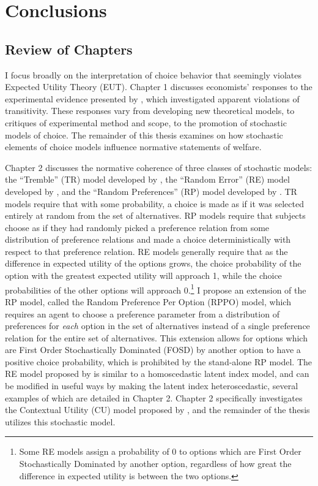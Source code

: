 \documentclass[../main.tex]{subfiles}
\begin{document}
\doublespacing
\setcounter{chapter}{4}

\chapter{Conclusions}


\section{Review of Chapters}

I focus broadly on the interpretation of choice behavior that seemingly violates Expected Utility Theory (EUT).
Chapter 1 discusses economists' responses to the experimental evidence presented by \textcite{Grether1979}, which investigated apparent violations of transitivity.
These responses vary from developing new theoretical models, to critiques of experimental method and scope, to the promotion of stochastic models of choice.
The remainder of this thesis examines on how stochastic elements of choice models influence normative statements of welfare.

Chapter 2 discusses the normative coherence of three classes of stochastic models: the \enquote{Tremble} (TR) model developed by \textcite{Harless1994}, the \enquote{Random Error} (RE) model developed by \textcite{Hey1994}, and the \enquote{Random Preferences} (RP) model developed by \textcite{Loomes1998}.
TR models require that with some probability, a choice is made as if it was selected entirely at random from the set of alternatives.
RP models require that subjects choose as if they had randomly picked a preference relation from some distribution of preference relations and made a choice deterministically with respect to that preference relation.
RE models generally require that as the difference in expected utility of the options grows, the choice probability of the option with the greatest expected utility will approach 1, while the choice probabilities of the other options will approach 0.\footnote{
	Some RE models assign a probability of 0 to options which are First Order Stochastically Dominated by another option, regardless of how great the difference in expected utility is between the two options.
}
I propose an extension of the RP model, called the Random Preference Per Option (RPPO) model, which requires an agent to choose a preference parameter from a distribution of preferences for \textit{each} option in the set of alternatives instead of a single preference relation for the entire set of alternatives.
This extension allows for options which are First Order Stochastically Dominated (FOSD) by another option to have a positive choice probability, which is prohibited by the stand-alone RP model.
The RE model proposed by \textcite{Hey1994} is similar to a homoscedastic latent index model, and can be modified in useful ways by making the latent index heteroscedastic, several examples of which are detailed in Chapter 2.
Chapter 2 specifically investigates the Contextual Utility (CU) model proposed by \textcite{Wilcox2008}, and the remainder of the thesis utilizes this stochastic model.
\end{document}
